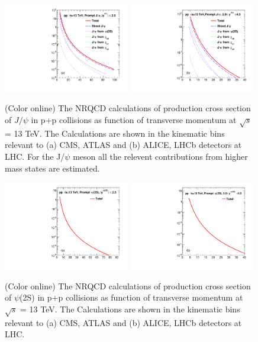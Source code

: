 \documentclass[aps,prc,preprint,superscriptaddress,showpacs,showkeys,amsmath]{revtex4-1}
\begin{document}
\begin{figure}
\includegraphics[width=0.49\textwidth]{Figures/Predict/Fig_ATLAS_D2NDPtDy_RootS13TeV_PromptJPsi_Y2525.pdf}
\includegraphics[width=0.49\textwidth]{Figures/Predict/Fig_ALICE_D2NDPtDy_RootS13TeV_PromptJPsi_Y2045.pdf}
\caption{(Color online) The NRQCD calculations of production cross section of $J/\psi$ in p+p collisions 
  as function of transverse momentum at $\sqrt{s}$ = 13 TeV. The Calculations are shown in the kinematic
  bins relevant to (a) CMS, ATLAS and (b) ALICE, LHCb detectors at LHC. For the J/$\psi$ meson all the 
  relevent contributions from higher mass states are estimated.
}
\label{Fig:SigmaJPsi}
\end{figure}


\begin{figure}
\includegraphics[width=0.49\textwidth]{Figures/Predict/Fig_ATLAS_D2NDPtDy_RootS13TeV_DirectPsi_Y2525.pdf}
\includegraphics[width=0.49\textwidth]{Figures/Predict/Fig_ALICE_D2NDPtDy_RootS13TeV_DirectPsi_Y2045.pdf}
\caption{(Color online) The NRQCD calculations of production cross section of $\psi$(2S) in p+p collisions 
  as function of transverse momentum at $\sqrt{s}$ = 13 TeV. The Calculations are shown in the kinematic
  bins relevant to (a) CMS, ATLAS and (b) ALICE, LHCb detectors at LHC. 
}
\label{Fig:SigmaPsi}
\end{figure}
\end{document}
